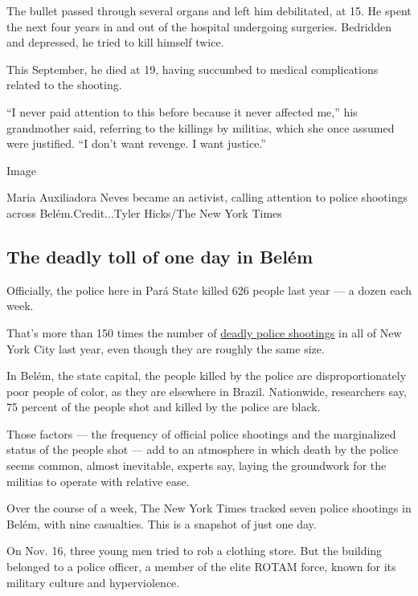 The bullet passed through several organs and left him debilitated, at
15. He spent the next four years in and out of the hospital undergoing
surgeries. Bedridden and depressed, he tried to kill himself twice.

This September, he died at 19, having succumbed to medical complications
related to the shooting.

``I never paid attention to this before because it never affected me,''
his grandmother said, referring to the killings by militias, which she
once assumed were justified. ``I don't want revenge. I want justice.''

Image

Maria Auxiliadora Neves became an activist, calling attention to police
shootings across Belém.Credit...Tyler Hicks/The New York Times

\hypertarget{the-deadly-toll-of-one-day-in-beluxe9m}{%
\subsection{The deadly toll of one day in
Belém}\label{the-deadly-toll-of-one-day-in-beluxe9m}}

Officially, the police here in Pará State killed 626 people last year
--- a dozen each week.

That's more than 150 times the number of
\href{https://www.nytimes3xbfgragh.onion/2019/10/25/nyregion/police-involved-shooting-brooklyn.html}{deadly
police shootings} in all of New York City last year, even though they
are roughly the same size.

In Belém, the state capital, the people killed by the police are
disproportionately poor people of color, as they are elsewhere in
Brazil. Nationwide, researchers say, 75 percent of the people shot and
killed by the police are black.

Those factors --- the frequency of official police shootings and the
marginalized status of the people shot --- add to an atmosphere in which
death by the police seems common, almost inevitable, experts say, laying
the groundwork for the militias to operate with relative ease.

Over the course of a week, The New York Times tracked seven police
shootings in Belém, with nine casualties. This is a snapshot of just one
day.

On Nov. 16, three young men tried to rob a clothing store. But the
building belonged to a police officer, a member of the elite ROTAM
force, known for its military culture and hyperviolence.

